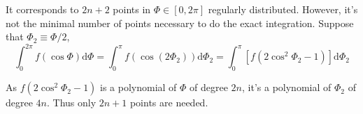 It corresponds to $2n+2$ points in $\Phi\in\left[0,2\pi\right]$
regularly distributed. However, it's not the minimal number of points
necessary to do the exact integration. Suppose that $\Phi_{2}\equiv\Phi/2$,
\begin{equation}
\int_{0}^{2\pi}f(\cos\Phi)\mathrm{d}\Phi=\int_{0}^{\pi}f(\cos(2\Phi_{2}))\mathrm{d}\Phi_{2}=\int_{0}^{\pi}\left[f(2\cos^{2}\Phi_{2}-1)\right]\mathrm{d}\Phi_{2}
\end{equation}


As $f(2\cos^{2}\Phi_{2}-1)$ is a polynomial of $\Phi$ of degree
$2n$, it's a polynomial of $\Phi_{2}$ of degree $4n$. Thus only
$2n+1$ points are needed.
